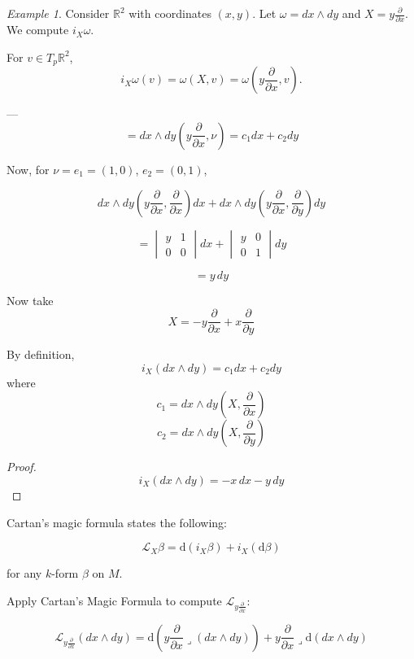 \documentclass[11pt]{article}
\theoremstyle{definition}
\theoremstyle{remark}
\newtheorem{example}{Example}[section]
\begin{document}
\begin{example}\label{ex:contraction_example}
Consider $\mathbb{R}^2$ with coordinates $(x, y)$. Let $\omega = dx \wedge dy$ and $X = y \frac{\partial}{\partial x}$. We compute $i_X \omega$.

For $v \in T_p \mathbb{R}^2$,
\[
i_X \omega(v) = \omega(X, v) = \omega\left(y \frac{\partial}{\partial x}, v\right).
\]
\end{example}

---
\[
= dx \wedge dy \left( y \frac{\partial}{\partial x}, \nu \right) = c_1 dx + c_2 dy
\]

Now, for \(\nu = e_1 = (1, 0)\), \(e_2 = (0, 1)\),

\[
dx \wedge dy \left( y \frac{\partial}{\partial x}, \frac{\partial}{\partial x} \right) dx + dx \wedge dy \left( y \frac{\partial}{\partial x}, \frac{\partial}{\partial y} \right) dy
\]

\[
= \begin{vmatrix} y & 1 \\ 0 & 0 \end{vmatrix} dx + \begin{vmatrix} y & 0 \\ 0 & 1 \end{vmatrix} dy
\]

\[
= y \, dy
\]

Now take
\[
X = -y \frac{\partial}{\partial x} + x \frac{\partial}{\partial y}
\]

By definition,
\[
i_X (dx \wedge dy) = c_1 dx + c_2 dy
\]
where
\[
c_1 = dx \wedge dy \left( X, \frac{\partial}{\partial x} \right)
\]
\[
c_2 = dx \wedge dy \left( X, \frac{\partial}{\partial y} \right)
\]

\begin{proof}
\[
i_X (dx \wedge dy) = -x \, dx - y \, dy
\]
\end{proof}

Cartan's magic formula states the following:

\[
\mathcal{L}_X \beta = \mathrm{d}(i_X \beta) + i_X (\mathrm{d}\beta)
\]

for any $k$-form $\beta$ on $M$.

Apply Cartan's Magic Formula to compute $\mathcal{L}_{y \frac{\partial}{\partial x}}$:

\[
\mathcal{L}_{y \frac{\partial}{\partial x}} (dx \wedge dy) = \mathrm{d} \left( y \frac{\partial}{\partial x} \lrcorner (dx \wedge dy) \right) + y \frac{\partial}{\partial x} \lrcorner \mathrm{d}(dx \wedge dy)
\]
\end{document}
